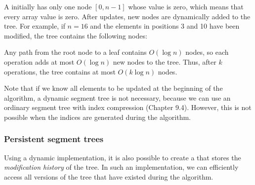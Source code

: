 A  initially has
only one node $[0,n-1]$ whose value is zero,
which means that every array value is zero.
After updates, new nodes are dynamically added
to the tree.
For example, if $n=16$ and the elements
in positions 3 and 10 have been modified,
the tree contains the following nodes:
\begin{center}
\end{center}

Any path from the root node to a leaf contains
$O(\log n)$ nodes,
so each operation adds at most $O(\log n)$
new nodes to the tree.
Thus, after $k$ operations, the tree contains
at most $O(k \log n)$ nodes.

Note that if we know all elements to be updated
at the beginning of the algorithm,
a dynamic segment tree is not necessary,
because we can use an ordinary segment tree with
index compression (Chapter 9.4).
However, this is not possible when the indices
are generated during the algorithm.

\subsubsection{Persistent segment trees}


Using a dynamic implementation,
it is also possible to create a
 that stores
the \emph{modification history} of the tree.
In such an implementation, we can
efficiently access
all versions of the tree that have
existed during the algorithm.

